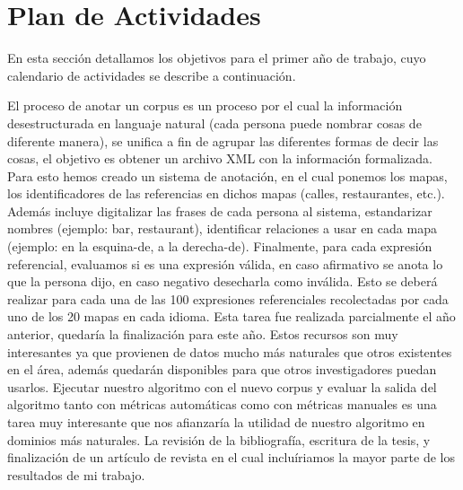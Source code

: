 \section{Plan de Actividades}
\label{plandetrabajo}

En esta secci\'on detallamos los objetivos para el primer a\~no de trabajo, cuyo calendario de actividades se describe a continuaci\'on. 

El proceso de anotar un corpus es un proceso por el cual la informaci\'on desestructurada en languaje
natural (cada persona puede nombrar cosas de diferente manera), se unifica a fin de agrupar las
diferentes formas de decir las cosas, el objetivo es obtener un archivo XML con la informaci\'on
formalizada. Para esto hemos creado un sistema de anotaci\'on, en el cual ponemos los mapas,
los identificadores de las referencias en dichos mapas (calles, restaurantes, etc.). Adem\'as
incluye digitalizar las frases de cada persona al sistema, estandarizar nombres
(ejemplo: bar, restaurant), identificar relaciones a usar en cada mapa (ejemplo:
en la esquina-de, a la derecha-de). Finalmente, para cada expresi\'on referencial,
evaluamos si es una expresi\'on v\'alida, en caso afirmativo se anota lo que la persona dijo,
en caso negativo desecharla como inv\'alida. Esto se deber\'a realizar
para cada una de las 100 expresiones referenciales recolectadas por cada uno de
los 20 mapas en cada idioma. Esta tarea fue realizada parcialmente el a\~{n}o anterior, quedar\'{i}a
la finalizaci\'on para este a\~{n}o. Estos recursos son muy interesantes ya que provienen de datos
mucho m\'as naturales que otros existentes en el \'area, adem\'as quedar\'an disponibles para que 
otros investigadores puedan usarlos.
Ejecutar nuestro algoritmo con el nuevo corpus y evaluar la salida del algoritmo tanto con m\'etricas 
autom\'aticas como con m\'etricas manuales es una tarea muy interesante que nos afianzar\'ia 
la utilidad de nuestro algoritmo en dominios m\'as naturales. La revisi\'on de la bibliograf\'ia, 
escritura de la tesis, y finalizaci\'on de un art\'iculo de revista en el cual inclu\'iriamos 
la mayor parte de los resultados de mi trabajo.



